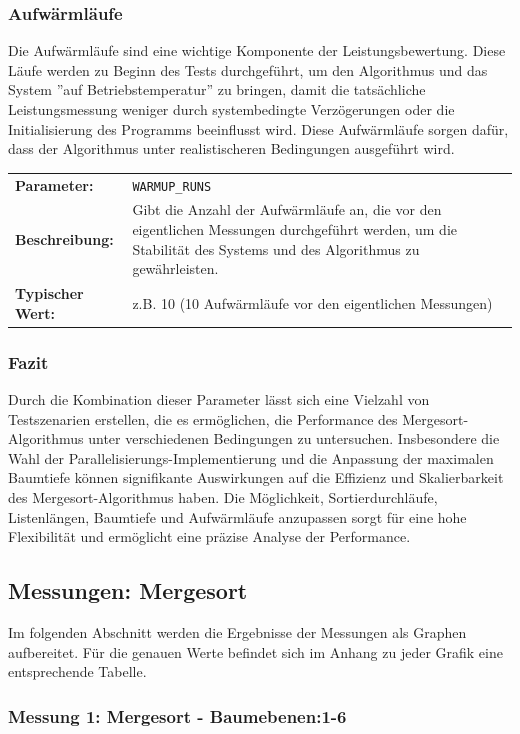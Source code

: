 \documentclass[fontsize=12pt,paper=a4,twoside=semi,parskip=half-,headsepline,headinclude]{scrreprt}
\begin{document}
\subsubsection{Aufwärmläufe}

Die Aufwärmläufe sind eine wichtige Komponente der Leistungsbewertung. Diese Läufe werden zu Beginn des Tests durchgeführt, um den Algorithmus und das System ''auf Betriebstemperatur'' zu bringen, damit die tatsächliche Leistungsmessung weniger durch systembedingte Verzögerungen oder die Initialisierung des Programms beeinflusst wird. Diese Aufwärmläufe sorgen dafür, dass der Algorithmus unter realistischeren Bedingungen ausgeführt wird.

\begin{tabularx}{\textwidth}{@{}lX@{}}
	\textbf{Parameter:}    & \texttt{WARMUP\_RUNS} \\
	\textbf{Beschreibung:} & Gibt die Anzahl der Aufwärmläufe an, die vor den eigentlichen Messungen durchgeführt werden, um die Stabilität des Systems und des Algorithmus zu gewährleisten. \\
	\textbf{Typischer Wert:} & z.B. 10 (10 Aufwärmläufe vor den eigentlichen Messungen)
\end{tabularx}

\subsubsection{Fazit}

Durch die Kombination dieser Parameter lässt sich eine Vielzahl von Testszenarien erstellen, die es ermöglichen, die Performance des Mergesort-Algorithmus unter verschiedenen Bedingungen zu untersuchen. Insbesondere die Wahl der Parallelisierungs-Implementierung und die Anpassung der maximalen Baumtiefe können signifikante Auswirkungen auf die Effizienz und Skalierbarkeit des Mergesort-Algorithmus haben. Die Möglichkeit, Sortierdurchläufe, Listenlängen, 
Baumtiefe und Aufwärmläufe anzupassen sorgt für eine hohe Flexibilität und ermöglicht eine präzise Analyse der Performance.

\subsection{Messungen: Mergesort}

Im folgenden Abschnitt werden die Ergebnisse der Messungen 
als Graphen aufbereitet. Für die genauen Werte befindet sich im 
Anhang zu jeder Grafik eine entsprechende Tabelle.

\subsubsection{Messung 1: Mergesort - Baumebenen:1-6}
\end{document}
